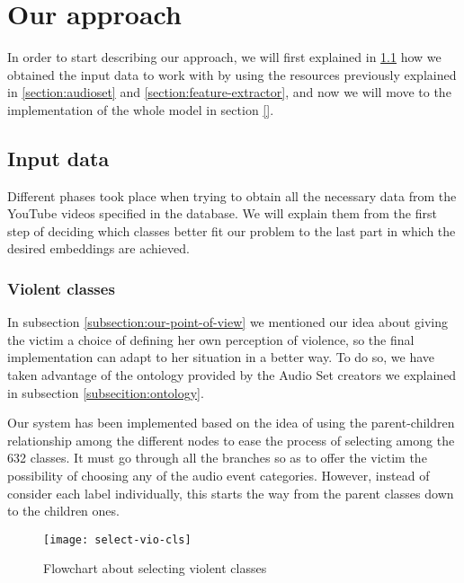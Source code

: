 \section{Our approach}
\label{section:our-approach}

	In order to start describing our approach, we will first explained in \ref{subsection:input-data} how we obtained the input data to work with by using the resources previously explained in \ref{section:audioset} and \ref{section:feature-extractor}, and now we will move to the implementation of the whole model in section \ref{}. 
	
\subsection{Input data}
\label{subsection:input-data}

	Different phases took place when trying to obtain all the necessary data from the YouTube videos specified in the database. We will explain them from the first step of deciding which classes better fit our problem to the last part in which the desired embeddings are achieved.
	
\subsubsection{Violent classes}
\label{subsection:violent-classes}

	In subsection \ref{subsection:our-point-of-view} we mentioned our idea about giving the victim a choice of defining her own perception of violence, so the final implementation can adapt to her situation in a better way. To do so, we have taken advantage of the ontology provided by the Audio Set creators we explained in subsection \ref{subsecition:ontology}. 
	
	Our system has been implemented based on the idea of using the parent-children relationship among the different nodes to ease the process of selecting among the 632 classes. It must go through all the branches so as to offer the victim the possibility of choosing any of the audio event categories. However, instead of consider each label individually, this starts the way from the parent classes down to the children ones.
	
	\begin{wrapfigure}{R}{0.4\textwidth}
		\centering
		\captionsetup{justification=centering}
		\texttt{[image: select-vio-cls]}
		\caption{Flowchart about selecting violent classes}
		\label{fig:mesh3}
	\end{wrapfigure}
	
